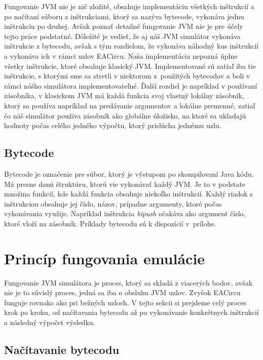 Fungovanie JVM nie je nič zložité, obsahuje implementáciu všetkých inštrukcií a po načítaní súboru z inštrukciami, ktorý sa nazýva bytecode, vykonáva jednu inštrukciu po druhej. Avšak poznať detailné fungovanie JVM nie je pre účely tejto práce podstatné. Dôležité je vedieť, že aj náš JVM simulátor vykonáva inštrukcie z bytecodu, avšak s tým rozdielom, že vykonáva náhodný kus inštrukcií a vykonáva ich v rámci uzlov EACircu. Naša implementácia nepozná úplne všetky inštrukcie, ktoré obsahuje klasický JVM. Implementované sú zatiaľ iba tie inštrukcie, s ktorými sme sa stretli v niektorom z~použitých bytecodov a boli v rámci nášho simulátora implementovateľné. Ďalší rozdiel je napríklad v používaní zásobníka, v klasickom JVM má každá funkcia svoj vlastný lokálny zásobník, ktorý sa používa napríklad na predávanie argumentov a lokálne premenné, zatiaľ čo náš simulátor používa zásobník ako globálne úložisko, na ktoré sa ukladajú hodnoty počas celého jedného výpočtu, ktorý prislúcha jednému uzlu.  

\subsection{Bytecode}
\label{subsec:bytecode}

Bytecode je označenie pre súbor, ktorý je výstupom po skompilovaní Java kódu. Má presne danú štruktúru, ktorú vie vykonávať každý JVM. Je to v podstate množina funkcií, kde každá funkcia obsahuje niekoľko inštrukcií. Každý riadok s inštrukciou obsahuje jej číslo, názov, prípadne argumenty, ktoré počas vykonávania využije. Napríklad inštrukcia \textit{bipush} očakáva ako argument číslo, ktoré vloží na zásobník. Príklady bytecodu sú k dispozícií v~prílohe.

\section{Princíp fungovania emulácie}
\label{sec:jvm-principle}

Fungovanie JVM simulátora je proces, ktorý sa skladá z viacerých bodov, avšak nie je to súvislý proces, jedná sa iba o obsluhu JVM uzlov. Zvyšok EACircu funguje rovnako ako pri bežných uzloch. V tejto sekcii si prejdeme celý proces krok po kroku, od načítavania bytecodu až po vykonávanie konkrétnych inštrukcií a následný výpočet výsledku. 

\subsection{Načítavanie bytecodu}
\label{parsing-bytecode}

